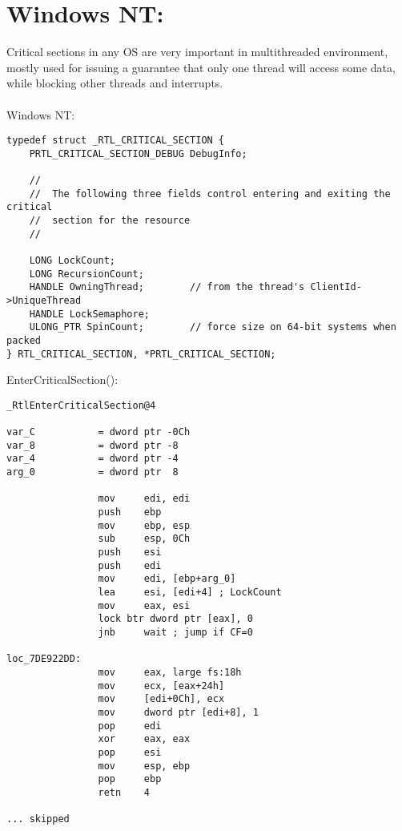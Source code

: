 \section{Windows NT: }

\label{critical_sections}

{Critical sections in any \ac{OS} are very important in multithreaded environment,
mostly used for issuing a guarantee
that only one thread will access some data, while blocking other threads and interrupts}. \\
\\
  
 \gls{Windows NT}:

\begin{lstlisting}[caption=(Windows Research Kernel v1.2) public/sdk/inc/nturtl.h]
typedef struct _RTL_CRITICAL_SECTION {
    PRTL_CRITICAL_SECTION_DEBUG DebugInfo;

    //
    //  The following three fields control entering and exiting the critical
    //  section for the resource
    //

    LONG LockCount;
    LONG RecursionCount;
    HANDLE OwningThread;        // from the thread's ClientId->UniqueThread
    HANDLE LockSemaphore;
    ULONG_PTR SpinCount;        // force size on 64-bit systems when packed
} RTL_CRITICAL_SECTION, *PRTL_CRITICAL_SECTION;
\end{lstlisting}

 EnterCriticalSection():

\begin{lstlisting}[caption=Windows 2008/ntdll.dll/x86 (begin)]
_RtlEnterCriticalSection@4

var_C           = dword ptr -0Ch
var_8           = dword ptr -8
var_4           = dword ptr -4
arg_0           = dword ptr  8

                mov     edi, edi
                push    ebp
                mov     ebp, esp
                sub     esp, 0Ch
                push    esi
                push    edi
                mov     edi, [ebp+arg_0]
                lea     esi, [edi+4] ; LockCount
                mov     eax, esi
                lock btr dword ptr [eax], 0
                jnb     wait ; jump if CF=0

loc_7DE922DD:
                mov     eax, large fs:18h
                mov     ecx, [eax+24h]
                mov     [edi+0Ch], ecx
                mov     dword ptr [edi+8], 1
                pop     edi
                xor     eax, eax
                pop     esi
                mov     esp, ebp
                pop     ebp
                retn    4

... skipped
\end{lstlisting}

